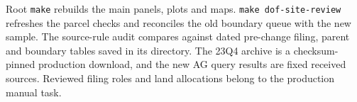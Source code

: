 Root \texttt{make} rebuilds the main panels, plots and maps.
\texttt{make dof-site-review} refreshes the parcel checks and reconciles the
old boundary queue with the new sample. The source-rule audit compares
against dated pre-change filing, parent and boundary tables saved in its
 directory. The 23Q4 archive is a checksum-pinned production
download, and the new AG query results are fixed received sources. Reviewed
filing roles and land allocations belong to the production manual task.
